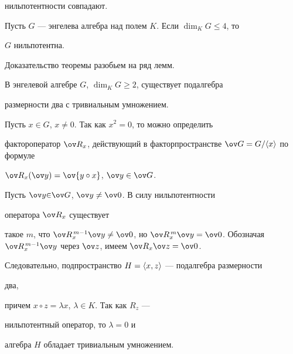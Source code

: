 нильпотентности совпадают. 


 


 


\begin{thm} 


Пусть $G$ --- энгелева алгебра над полем $K$. Если $\dim_K G\le4$, то 


$G$ нильпотентна. 


\end{thm} 


 


Доказательство теоремы разобьем на ряд лемм. 


 


\begin{lem} 


В энгелевой алгебре $G$, $\dim_K G\ge2$, существует подалгебра 


размерности два с тривиальным умножением. 


\end{lem} 


 


\begin{pf} 


Пусть $x\in G$, $x\ne0$. Так как $x^2=0$, то можно определить 


фактороператор $\ov R_x$, действующий в факторпространстве $\ov 


G=G/\la x\ra$ по формуле 


$\ov R_x(\ov y)=\ov{y\circ x}$, $\ov y\in\ov G$. 


 


Пусть $\ov y{\in}\ov G$, $\ov y\ne \ov 0$. В силу нильпотентности 


оператора $\ov R_x$ существует 


такое $m$, что $\ov R^{\,m-1}_x\ov y\ne\ov 0$, но $\ov R^{\,m}_x\ov 


y=\ov 0$. Обозначая $\ov R^{\,m-1}_x\ov y$ через $\ov z$, имеем $\ov 


R_x\ov z=\ov 0$. 


Следовательно, подпространство $H=\langle x,z\rangle$ --- подалгебра размерности 


два, 


причем $x\circ z=\lambda x$, $\lambda\in K$. Так как $R_z$ --- 


нильпотентный оператор, то $\lambda=0$ и 


алгебра $H$ обладает тривиальным умножением. 


\end{pf} 


